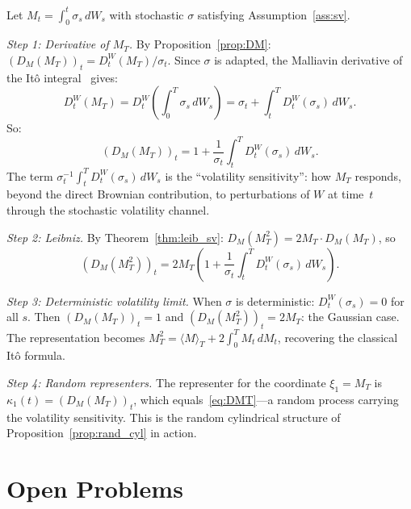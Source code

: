 \documentclass[11pt,a4paper]{article}
\theoremstyle{plain}
\theoremstyle{definition}
\theoremstyle{remark}
\begin{document}
Let $M_t = \int_0^t \sigma_s\,dW_s$ with stochastic $\sigma$ satisfying Assumption~\ref{ass:sv}.

\emph{Step 1: Derivative of $M_T$.} By Proposition~\ref{prop:DM}: $(D_M(M_T))_t = D_t^W(M_T)/\sigma_t$. Since $\sigma$ is adapted, the Malliavin derivative of the It\^o integral~\cite[Proposition 1.3.3]{Nualart2006} gives:
\[
D_t^W(M_T) = D_t^W\!\left(\int_0^T \sigma_s\,dW_s\right) = \sigma_t + \int_t^T D_t^W(\sigma_s)\,dW_s.
\]
So:
\begin{equation}\label{eq:DMT}
(D_M(M_T))_t = 1 + \frac{1}{\sigma_t}\int_t^T D_t^W(\sigma_s)\,dW_s.
\end{equation}
The term $\sigma_t^{-1}\int_t^T D_t^W(\sigma_s)\,dW_s$ is the ``volatility sensitivity'': how $M_T$ responds, beyond the direct Brownian contribution, to perturbations of $W$ at time~$t$ through the stochastic volatility channel.

\emph{Step 2: Leibniz.} By Theorem~\ref{thm:leib_sv}: $D_M(M_T^2) = 2M_T \cdot D_M(M_T)$, so
\[
(D_M(M_T^2))_t = 2M_T\!\left(1 + \frac{1}{\sigma_t}\int_t^T D_t^W(\sigma_s)\,dW_s\right).
\]

\emph{Step 3: Deterministic volatility limit.} When $\sigma$ is deterministic: $D_t^W(\sigma_s) = 0$ for all $s$. Then $(D_M(M_T))_t = 1$ and $(D_M(M_T^2))_t = 2M_T$: the Gaussian case. The representation becomes $M_T^2 = \langle M \rangle_T + 2\int_0^T M_t\,dM_t$, recovering the classical It\^o formula.

\emph{Step 4: Random representers.} The representer for the coordinate $\xi_1 = M_T$ is $\kappa_1(t) = (D_M(M_T))_t$, which equals~\eqref{eq:DMT}---a random process carrying the volatility sensitivity. This is the random cylindrical structure of Proposition~\ref{prop:rand_cyl} in action.


\section{Open Problems}\label{sec:open}
\end{document}
